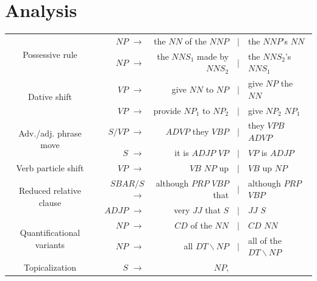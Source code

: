 \documentclass[11pt]{article}
\begin{document}
\section{Analysis} \label{analysis}

\begin{table}[!ht]
  \begin{center}
  \begin{tabular}{|c|rrcl|}
    \hline
    \multirow{2}{*}{Possessive rule} & $\mathit{NP}$ $\rightarrow$ & the
    $\mathit{NN}$ of the $\mathit{NNP}$ & $\mid$ & the
    $\mathit{NNP}$'s $\mathit{NN}$ \\
    & $\mathit{NP}$ $\rightarrow$  & the $\mathit{NNS}_1$ made by
    $\mathit{NNS}_2$ & $\mid$ & the $\mathit{NNS}_2$'s
    $\mathit{NNS}_1$ \\
    \hline
    \multirow{2}{*}{Dative shift} & $\mathit{VP}$ $\rightarrow$ & give
    $\mathit{NN}$ to $\mathit{NP}$ & $\mid$ & give $\mathit{NP}$ the
    $\mathit{NN}$ \\
    & $\mathit{VP}$ $\rightarrow$ & provide $\mathit{NP}_1$ to
    $\mathit{NP}_2$ & $\mid$ & give $\mathit{NP}_2$
    $\mathit{NP}_1$ \\
    \hline
    \hline
    \multirow{2}{*}{Adv./adj. phrase move} & 
    $\mathit{S/VP}$ $\rightarrow$ & $\mathit{ADVP}$ they $\mathit{VBP}$
    & $\mid$ & they $\mathit{VPB}$ $\mathit{ADVP}$ \\
    & $\mathit{S}$ $\rightarrow$ & it is $\mathit{ADJP}$ $\mathit{VP}$
    & $\mid$ & $\mathit{VP}$ is $\mathit{ADJP}$ \\
    \hline
    Verb particle shift & 
    $\mathit{VP}$ $\rightarrow$ & $\mathit{VB}$ $\mathit{NP}$ up &
    $\mid$ & $\mathit{VB}$ up $\mathit{NP}$ \\
    \hline
    \multirow{2}{*}{Reduced relative clause} & $\mathit{SBAR/S}$ $\rightarrow$ &
    although $\mathit{PRP}$ $\mathit{VBP}$ that & $\mid$ &although
    $\mathit{PRP}$ $\mathit{VBP}$ \\
    & $\mathit{ADJP}$ $\rightarrow$ &
    very $\mathit{JJ}$ that $\mathit{S}$ & $\mid$ & $\mathit{JJ}$ $\mathit{S}$ \\
    \hline
    \multirow{2}{*}{Quantificational variants} & 
    $\mathit{NP}$ $\rightarrow$ & $\mathit{CD}$ of the $\mathit{NN}$
    & $\mid$ & $\mathit{CD}$ $\mathit{NN}$ \\
    & $\mathit{NP}$ $\rightarrow$ & all $\mathit{DT\backslash NP}$
    & $\mid$ & all of the $\mathit{DT\backslash NP}$ \\
    \hline
    Topicalization  & $\mathit{S}$ $\rightarrow$ & $\mathit{NP}$,

\end{tabular}
\end{center}
\end{table}
\end{document}
